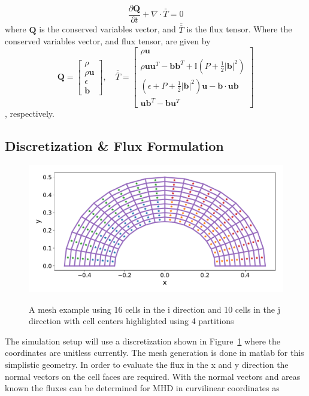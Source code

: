 \documentclass[paper=a4, fontsize=11pt]{scrartcl}
\newcommand*{\rttensor}[1]{\overline{\overline{#1}}}
\newcommand{\pfrac}[2]{\frac{\partial#1}{\partial#2}}
\numberwithin{equation}{section}                %
\numberwithin{figure}{section}                  %
\numberwithin{table}{section}                           %
\begin{document}
\begin{equation}\label{eqn:mhdvector}
  \pfrac{\mathbf{Q}}{t} + \nabla \cdot \rttensor{T} = 0
\end{equation}
where $\mathbf{Q}$ is the conserved variables vector, and $\rttensor{T}$ is the flux tensor. Where the conserved variables vector, and flux tensor, are given by
\[
  \mathbf{Q}=
  \begin{bmatrix}
    \rho  \\
    \rho \mathbf{u}  \\
    \epsilon\\
    \mathbf{b} 
  \end{bmatrix}
  ,\quad \rttensor{T} =
  \begin{bmatrix}
    \rho \mathbf{u}  \\
    \rho \mathbf{u}\mathbf{u}^T - \mathbf{b}\mathbf{b}^T + \mathbb{I}\left(P + \frac{1}{2}|\mathbf{b}|^2\right)\\
    \left(\epsilon + P + \frac{1}{2}|\mathbf{b}|^2\right)\mathbf{u}- \mathbf{b}\cdot\mathbf{u}\mathbf{b}\\
    \mathbf{u}\mathbf{b}^T-\mathbf{b}\mathbf{u}^T
  \end{bmatrix}
\]
, respectively. 

\subsection{Discretization \& Flux Formulation}
  \begin{figure}[!htb]
    \centering
    \includegraphics[width=1.0\linewidth]{fig/16x10mesh}\label{fig:ovrvw:mesh}
    \caption{A mesh example using 16 cells in the i direction and 10 cells in the j direction with cell centers highlighted using 4 partitions}
  \end{figure}

The simulation setup will use a discretization shown in Figure~\ref{fig:ovrvw:mesh} where the coordinates are unitless currently. The mesh generation is done in matlab for this simplistic geometry. In order to evaluate the flux in the x and y direction the normal vectors on the cell faces are required. With the normal vectors and areas known the fluxes can be determined for MHD in curvilinear coordinates as
\end{document}
